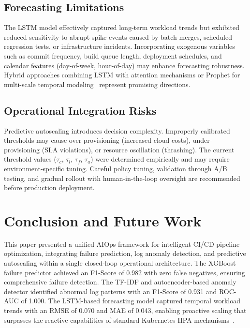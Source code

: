 \documentclass[a4paper,fleqn]{cas-dc}
\begin{document}
\subsection{Forecasting Limitations}\label{subsec:forecastlimit}

The LSTM model effectively captured long-term workload trends but exhibited reduced sensitivity to abrupt spike events caused by batch merges, scheduled regression tests, or infrastructure incidents.
Incorporating exogenous variables such as commit frequency, build queue length, deployment schedules, and calendar features (day-of-week, hour-of-day) may enhance forecasting robustness.
Hybrid approaches combining LSTM with attention mechanisms or Prophet for multi-scale temporal modeling~\citep{guruge2025prophet} represent promising directions.

\subsection{Operational Integration Risks}\label{subsec:oprisk}

Predictive autoscaling introduces decision complexity. Improperly calibrated thresholds may cause over-provisioning (increased cloud costs), under-provisioning (SLA violations), or resource oscillation (thrashing).
The current threshold values ($\tau_c$, $\tau_l$, $\tau_f$, $\tau_a$) were determined empirically and may require environment-specific tuning.
Careful policy tuning, validation through A/B testing, and gradual rollout with human-in-the-loop oversight are recommended before production deployment.

\section{Conclusion and Future Work}\label{sec:conclusion}

This paper presented a unified AIOps framework for intelligent CI/CD pipeline optimization, integrating failure prediction, log anomaly detection, and predictive autoscaling within a single closed-loop operational architecture.
The XGBoost failure predictor achieved an F1-Score of 0.982 with zero false negatives, ensuring comprehensive failure detection.
The TF-IDF and autoencoder-based anomaly detector identified abnormal log patterns with an F1-Score of 0.931 and ROC-AUC of 1.000.
The LSTM-based forecasting model captured temporal workload trends with an RMSE of 0.070 and MAE of 0.043, enabling proactive scaling that surpasses the reactive capabilities of standard Kubernetes HPA mechanisms~\citep{kubernetesDocs}.
\end{document}

